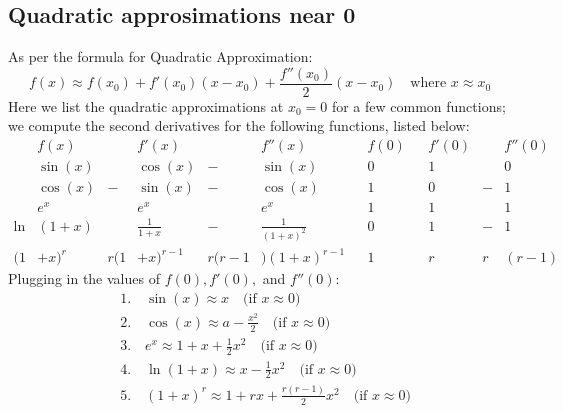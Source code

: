 \documentclass{report}
\begin{document}
\subsection{Quadratic approsimations near 0} %
As per the formula for Quadratic Approximation:
\begin{equation*}
f(x)\approx f(x_0)+f'(x_0)(x-x_0)+\frac{f''(x_0)}{2}(x-x_0)\quad\text{where $x\approx x_0$}
\end{equation*}
Here we list the quadratic approximations at $x_0=0$ for a few common functions; 
we compute the second derivatives for the following functions, listed below:
\begin{align*}
&f(x)&&f'(x)&&f''(x)&&f(0)&&f'(0)&&f''(0)\\
&\sin(x)&&\cos(x)&-&\sin(x)&&0&&1&&0\\
&\cos(x)&-&\sin(x)&-&\cos(x)&&1&&0&-&1\\
&e^x&&e^x&&e^x&&1&&1&&1\\
\ln&(1+x)&&\frac{1}{1+x}&-&\frac{1}{(1+x)^2}&&0&&1&-&1\\
(1&+x)^r&r(1&+x)^{r-1}&r(r-1&)(1+x)^{r-1}&&1&&r&r&(r-1)
\end{align*}
Plugging in the values of $f(0),f'(0),$ and $f''(0)$:
\begin{align*}
&1.\quad\sin(x)\approx x\quad\text{(if $x\approx0$)}\\
&2.\quad\cos(x)\approx a-\frac{x^2}{2}\quad\text{(if $x\approx0$)}\\
&3.\quad e^x\approx 1+x+\frac{1}{2}x^2\quad\text{(if $x\approx0$)}\\
&4.\quad\ln(1+x)\approx x-\frac{1}{2}x^2\quad\text{(if $x\approx0$)}\\
&5.\quad(1+x)^r\approx1+rx+\frac{r(r-1)}{2}x^2\quad\text{(if $x\approx0$)}
\end{align*}
\newpage
\end{document}
